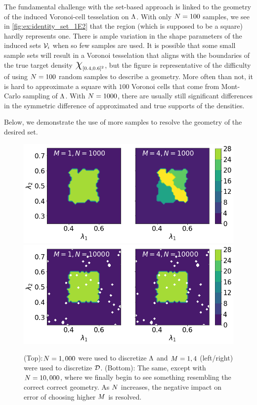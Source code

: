 The fundamental challenge with the set-based approach is linked to the geometry of the induced Voronoi-cell tesselation on ${\Lambda}$.
With only $N = 100$ samples, we see in \ref{fig:ex:identity_set_1E2} that the region (which is supposed to be a square) hardly represents one.
There is ample variation in the shape parameters of the induced sets $\mathcal{V}_i$ when so few samples are used.
It is possible that some small sample sets will result in a Voronoi tesselation that aligns with the boundaries of the true target density $\Chi_{[0.4, 0.6]^2}$, but the figure is representative of the difficulty of using $N = 100$ random samples to describe a geometry.
More often than not, it is hard to approximate a square with $100$ Voronoi cells that come from Mont-Carlo sampling of ${\Lambda}$.
With $N = 1000$, there are usually still significant differences in the symmetric difference of approximated and true supports of the densities.

Below, we demonstrate the use of more samples to resolve the geometry of the desired set.
\begin{figure}[ht]
\begin{minipage}{.975\textwidth}
  \includegraphics[width=\linewidth]{./examples/identity/set/M1-N1000_N1000-vs-M4-N1000_N1000.png}
  \includegraphics[width=\linewidth]{./examples/identity/set/M1-N10000_N10000-vs-M4-N10000_N10000.png}
\end{minipage}
\caption{
(Top):$N=1,000$ were used to discretize ${\Lambda}$ and $M=1, 4$ (left/right) were used to discretize $\mathcal{D}$.
(Bottom): The same, except with $N=10,000$, where we finally begin to see something resembling the correct correct geometry.
As $N$ increases, the negative impact on error of choosing higher $M$ is resolved.}
\label{fig:ex:identity_set_1E3_1E4}
\end{figure}


